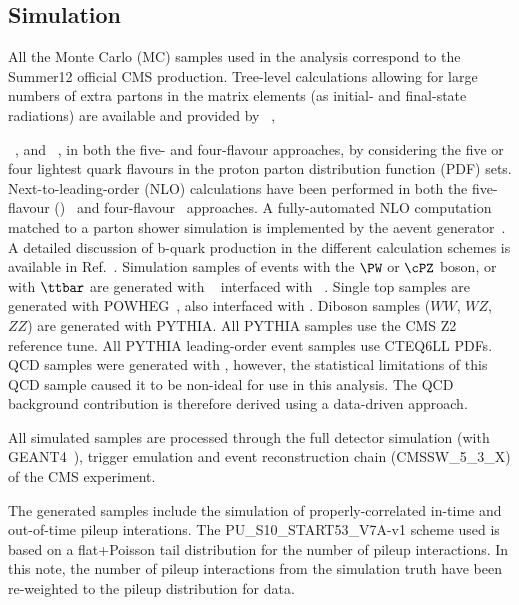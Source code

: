 \subsection{Simulation}
All the Monte Carlo (MC) samples used in the analysis correspond to the  {Summer12} official CMS production.
Tree-level calculations allowing for large numbers of extra
partons in the matrix elements (as initial- and final-state
radiations) are available and provided by
\MADGRAPH~\cite{Alwall:2007st,Alwall:2011uj},
{\ALPGEN~\cite{Mangano:2002ea}, and \SHERPA~\cite{Gleisberg:2008ta},
in both the five- and four-flavour approaches, \ie by considering the
five or four lightest quark flavours in the proton parton distribution
function (PDF) sets. Next-to-leading-order (NLO) calculations have
been performed in both the five-flavour (\MCFM)~\cite{Campbell:2000bg}
and four-flavour~\cite{FebresCordero:2008ci,Cordero:2009kv}
approaches. A fully-automated NLO computation matched to a parton
shower simulation is implemented by the a\MCATNLO event
generator~\cite{Frederix:2011qg,Frixione:2002ik}. A detailed
discussion of b-quark production in the different calculation schemes
is available in Ref.~\cite{Maltoni:2012pa}.
Simulation samples of events with the $\PW$ or $\cPZ$ boson, or with $\ttbar$ are generated with
\MADGRAPH~\cite{MADGRAPH} interfaced with
\PYTHIA~\cite{Sjostrand:2006za}.
Single top samples are generated with POWHEG~\cite{POWHEG},
also interfaced with \PYTHIA.
Diboson samples ($WW$, $WZ$, $ZZ$) are
generated with PYTHIA. All PYTHIA samples use the CMS Z2 reference tune.
All PYTHIA leading-order event samples use CTEQ6LL PDFs.
QCD samples were generated with \PYTHIA, however, 
the statistical limitations of this QCD sample caused it to be 
non-ideal for use in this analysis. 
The QCD background contribution is therefore derived using a data-driven approach.

All simulated samples are processed through the full detector simulation (with GEANT4~\cite{GEANT4}), 
trigger emulation and event reconstruction chain (CMSSW\_5\_3\_X) of the CMS experiment.

The generated samples include the simulation of properly-correlated in-time and out-of-time
pileup interations. The PU\_S10\_START53\_V7A-v1 scheme used is based on a
flat+Poisson tail distribution for the number of pileup interactions.
In this note, the number of pileup interactions from the simulation 
truth have been re-weighted to the pileup distribution for data.

}
